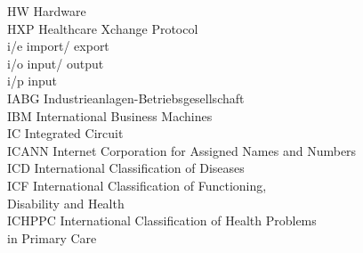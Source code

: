 \begin{tabbing}


    \>HW \>\>Hardware\\

    \>HXP \>\>Healthcare Xchange Protocol\\

    \>i/e \>\>import/ export\\

    \>i/o \>\>input/ output\\

    \>i/p \>\>input\\

    \>IABG \>\>Industrieanlagen-Betriebsgesellschaft\\



    \>IBM \>\>International Business Machines\\


    \>IC \>\>Integrated Circuit\\



    \>ICANN \>\>Internet Corporation for Assigned Names and Numbers\\

    \>ICD \>\>International Classification of Diseases\\

    \>ICF \>\>International Classification of Functioning,\\
        \>\>\>Disability and Health\\


    \>ICHPPC \>\>International Classification of Health Problems\\
        \>\>\>in Primary Care\\


\end{tabbing}
